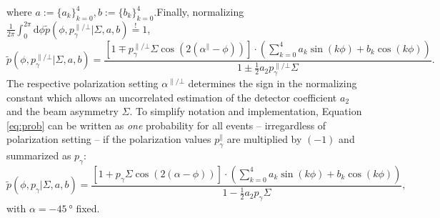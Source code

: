 where $a:=\{a_k\}_{k=0}^4, b:=\{b_k\}_{k=0}^4$.Finally, normalizing $\frac{1}{2\pi}\int_{0}^{2\pi}\text{d}\phi\tilde{p}\left(\phi,p_\gamma^{\parallel/\bot}\big|\Sigma,a,b\right)\overset{!}{=}1$,
\begin{equation}
	\tilde{p}\left(\phi,p_\gamma^{\parallel/\bot}\big|\Sigma,a,b\right)=\frac{\left[1\mp p_\gamma^{\parallel/\bot}\Sigma\cos\left(2\left(\alpha^\parallel-\phi\right)\right)\right]\cdot\left(\sum_{k=0}^4a_k\sin\left( k\phi\right)+b_k\cos\left(k\phi\right)\right)}{1\pm\frac{1}{2}a_2p_\gamma^{\parallel/\bot}\Sigma}.
	\label{eq:prob}
\end{equation}
The respective polarization setting $\alpha^{\parallel/\bot}$ determines the sign in the normalizing constant which allows an uncorrelated estimation of the detector coefficient $a_2$ and the beam asymmetry $\Sigma$. To simplify notation and implementation, Equation \eqref{eq:prob} can be written as \emph{one} probability for all events -- irregardless of polarization setting -- if the polarization values $p_\gamma^\parallel$ are multiplied by $(-1)$ and summarized as $p_\gamma$: \begin{equation}
	\tilde{p}\left(\phi,p_\gamma\big|\Sigma,a,b\right)=\frac{\left[1+p_\gamma\Sigma\cos\left(2\left(\alpha-\phi\right)\right)\right]\cdot\left(\sum_{k=0}^4a_k\sin\left( k\phi\right)+b_k\cos\left(k\phi\right)\right)}{1-\frac{1}{2}a_2p_\gamma\Sigma},
	\label{eq:prob}
\end{equation} 
with $\alpha=\SI{-45}{\degree}$ fixed.

